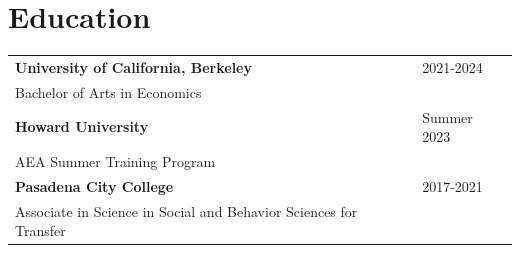 \section{\sc Education}


\begin{tabular}{@{}p{4.25in}p{2in}}
{\bf{University of California, Berkeley}} & 2021-2024 \\
Bachelor of Arts in Economics \\

{\bf{Howard University}} & Summer 2023 \\
AEA Summer Training Program \\

{\bf{Pasadena City College}} & 2017-2021 \\
Associate in Science in Social and Behavior Sciences for Transfer \\
\end{tabular}

\endinput

